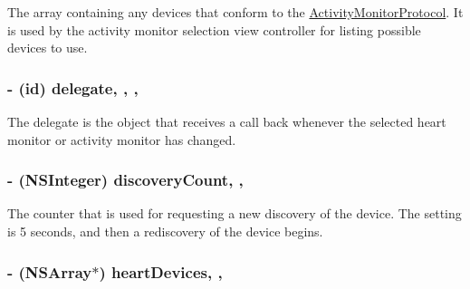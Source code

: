 The array containing any devices that conform to the \hyperlink{protocol_activity_monitor_protocol-p}{Activity\-Monitor\-Protocol}. It is used by the activity monitor selection view controller for listing possible devices to use. \hypertarget{interface_b_t_device_manager_a53dc4023fb9a5873cd8f7a82489d25c0}{
\subsubsection[{delegate}]{\setlength{\rightskip}{0pt plus 5cm}-\/ (id) delegate\hspace{0.3cm}{\ttfamily [read]}, {\ttfamily [write]}, {\ttfamily [nonatomic]}, {\ttfamily [weak]}}}\label{interface_b_t_device_manager_a53dc4023fb9a5873cd8f7a82489d25c0}
The delegate is the object that receives a call back whenever the selected heart monitor or activity monitor has changed. \hypertarget{interface_b_t_device_manager_ac70dac2c693cf191a05a606d7cea9763}{
\subsubsection[{discovery\-Count}]{\setlength{\rightskip}{0pt plus 5cm}-\/ (N\-S\-Integer) discovery\-Count\hspace{0.3cm}{\ttfamily [read]}, {\ttfamily [write]}, {\ttfamily [atomic]}}}\label{interface_b_t_device_manager_ac70dac2c693cf191a05a606d7cea9763}
The counter that is used for requesting a new discovery of the device. The setting is 5 seconds, and then a rediscovery of the device begins. \hypertarget{interface_b_t_device_manager_a76ffd5887aa2d8c8ea20df2384851d41}{
\subsubsection[{heart\-Devices}]{\setlength{\rightskip}{0pt plus 5cm}-\/ (N\-S\-Array$\ast$) heart\-Devices\hspace{0.3cm}{\ttfamily [read]}, {\ttfamily [write]}, {\ttfamily [atomic]}}}\label{interface_b_t_device_manager_a76ffd5887aa2d8c8ea20df2384851d41}
